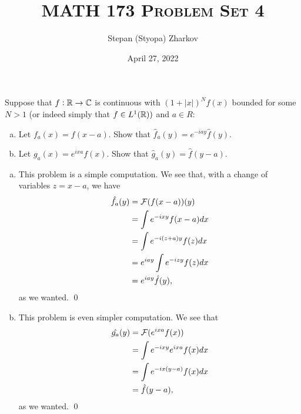 \documentclass{article}
\title{\textsc{MATH 173 Problem Set 4}}
\author{Stepan (Styopa) Zharkov}
\date{April 27, 2022}
\begin{document}
\maketitle
{} Suppose that $f : \RR \to \CC$ is continuous with $(1 + |x|)^Nf(x)$ bounded for some $N > 1$ (or
indeed simply that $f \in L^1(\RR))$ and $a \in R$:
\begin{enumerate}[(a)]
    \item Let $f_a(x) = f(x - a)$. Show that $\hat{f}_a(y) = e^{-iay} \hat{f}(y)$.
\item Let $g_a(x) = e^{ixa}f(x)$. Show that $\hat{g}_a(y) = \hat{f}(y - a)$. 
\end{enumerate}
 \tri
\hop 
\solution
\begin{enumerate}[(a)]
    \item This problem is a simple computation. We see that, with a change of variables $z = x-a$, we have
    \begin{align*}
        \hat{f_a}(y) &= \cal{F}(f(x-a))(y) \\
        &= \int e^{-ixy}f(x-a)dx \\
        &= \int e^{-i(z+a)y}f(z)dx \\
        &= e^{iay}\int e^{-izy}f(z)dx \\
        &= e^{iay}\hat{f}(y),
    \end{align*}
    as we wanted. \qed
    \item This problem is even simpler computation. We see that 
    \begin{align*}
        \hat{g_a}(y) &= \cal{F}(e^{ixa}f(x))\\
        &= \int e^{-ixy}e^{ixa}f(x)dx \\
        &= \int e^{-ix(y-a)}f(x)dx \\
        &= \hat{f}(y-a),
    \end{align*}
    as we wanted. \qed
\end{enumerate}
\end{document}

